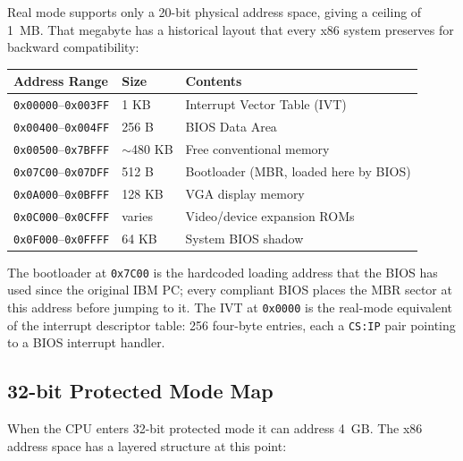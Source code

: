 \documentclass[11pt]{article}
\begin{document}
Real mode supports only a 20-bit physical address space, giving a ceiling of 1~MB. That
megabyte has a historical layout that every x86 system preserves for backward compatibility:

\begin{center}
\begin{tabular}{lll}
\toprule
\textbf{Address Range} & \textbf{Size} & \textbf{Contents} \\
\midrule
\texttt{0x00000}--\texttt{0x003FF} & 1 KB   & Interrupt Vector Table (IVT) \\
\texttt{0x00400}--\texttt{0x004FF} & 256 B  & BIOS Data Area \\
\texttt{0x00500}--\texttt{0x7BFFF} & $\sim$480 KB & Free conventional memory \\
\texttt{0x07C00}--\texttt{0x07DFF} & 512 B  & Bootloader (MBR, loaded here by BIOS) \\
\texttt{0x0A000}--\texttt{0x0BFFF} & 128 KB & VGA display memory \\
\texttt{0x0C000}--\texttt{0x0CFFF} & varies & Video/device expansion ROMs \\
\texttt{0x0F000}--\texttt{0x0FFFF} & 64 KB  & System BIOS shadow \\
\bottomrule
\end{tabular}
\end{center}

The bootloader at \texttt{0x7C00} is the hardcoded loading address that the BIOS has used since the
original IBM PC; every compliant BIOS places the MBR sector at this address before jumping
to it. The IVT at \texttt{0x0000} is the real-mode equivalent of the interrupt descriptor
table: 256 four-byte entries, each a \texttt{CS:IP} pair pointing to a BIOS interrupt handler.

\subsection{32-bit Protected Mode Map}

When the CPU enters 32-bit protected mode it can address 4~GB. The x86 address space has
a layered structure at this point:
\end{document}
